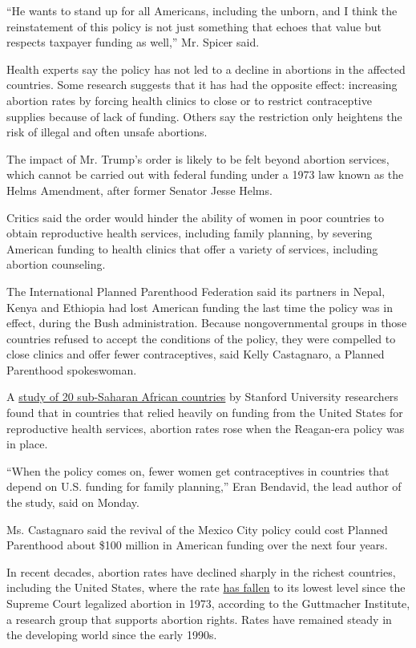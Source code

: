``He wants to stand up for all Americans, including the unborn, and I
think the reinstatement of this policy is not just something that echoes
that value but respects taxpayer funding as well,'' Mr. Spicer said.

Health experts say the policy has not led to a decline in abortions in
the affected countries. Some research suggests that it has had the
opposite effect: increasing abortion rates by forcing health clinics to
close or to restrict contraceptive supplies because of lack of funding.
Others say the restriction only heightens the risk of illegal and often
unsafe abortions.

The impact of Mr. Trump's order is likely to be felt beyond abortion
services, which cannot be carried out with federal funding under a 1973
law known as the Helms Amendment, after former Senator Jesse Helms.

Critics said the order would hinder the ability of women in poor
countries to obtain reproductive health services, including family
planning, by severing American funding to health clinics that offer a
variety of services, including abortion counseling.

The International Planned Parenthood Federation said its partners in
Nepal, Kenya and Ethiopia had lost American funding the last time the
policy was in effect, during the Bush administration. Because
nongovernmental groups in those countries refused to accept the
conditions of the policy, they were compelled to close clinics and offer
fewer contraceptives, said Kelly Castagnaro, a Planned Parenthood
spokeswoman.

A \href{http://www.who.int/bulletin/volumes/89/12/11-091660/en/}{study
of 20 sub-Saharan African countries} by Stanford University researchers
found that in countries that relied heavily on funding from the United
States for reproductive health services, abortion rates rose when the
Reagan-era policy was in place.

``When the policy comes on, fewer women get contraceptives in countries
that depend on U.S. funding for family planning,'' Eran Bendavid, the
lead author of the study, said on Monday.

Ms. Castagnaro said the revival of the Mexico City policy could cost
Planned Parenthood about \$100 million in American funding over the next
four years.

In recent decades, abortion rates have declined sharply in the richest
countries, including the United States, where the rate
\href{https://www.nytimes.com/2017/01/18/health/rate-of-us-abortions-hits-lowest-since-roe-v-wade.html}{has
fallen} to its lowest level since the Supreme Court legalized abortion
in 1973, according to the Guttmacher Institute, a research group that
supports abortion rights. Rates have remained steady in the developing
world since the early 1990s.

